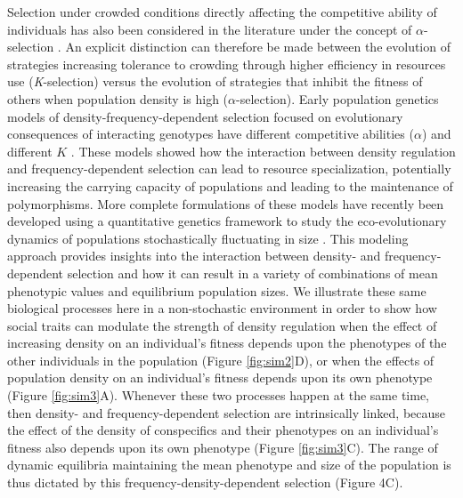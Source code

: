 \documentclass{article}
\begin{document}
  Selection under crowded conditions directly affecting the competitive ability of individuals has also been considered in the literature under the concept of ${\alpha}$-selection \citep{Joshi2001}. An explicit distinction can therefore be made between the evolution of strategies increasing tolerance to crowding through higher efficiency in resources use (\textit{K}-selection) versus the evolution of strategies that inhibit the fitness of others when population density is high (${\alpha}$-selection). Early population genetics models of density-frequency-dependent selection focused on evolutionary consequences of interacting genotypes have different competitive abilities ($\alpha$) and different $K$ \citep{Clarke1972, Anderson1983}. These models showed how the interaction between density regulation and frequency-dependent selection can lead to resource specialization, potentially increasing the carrying capacity of populations and leading to the maintenance of polymorphisms. More complete formulations of these models have recently been developed using a quantitative genetics framework to study the eco-evolutionary dynamics of populations stochastically fluctuating in size \citep{Lande2007, Engen2020}. This modeling approach provides insights into the interaction between density- and frequency-dependent selection and how it can result in a variety of combinations of mean phenotypic values and equilibrium population sizes. We illustrate these same biological processes here in a non-stochastic environment in order to show how social traits can modulate the strength of density regulation when the effect of increasing density on an individual's fitness depends upon the phenotypes of the other individuals in the population (Figure \ref{fig:sim2}D), or when the effects of population density on an individual's fitness depends upon its own phenotype (Figure \ref{fig:sim3}A). Whenever these two processes happen at the same time, then density- and frequency-dependent selection are intrinsically linked, because the effect of the density of conspecifics and their phenotypes on an individual's fitness also depends upon its own phenotype (Figure \ref{fig:sim3}C). The range of dynamic equilibria maintaining the mean phenotype and size of the population is thus dictated by this frequency-density-dependent selection (Figure 4C).  
\end{document}
